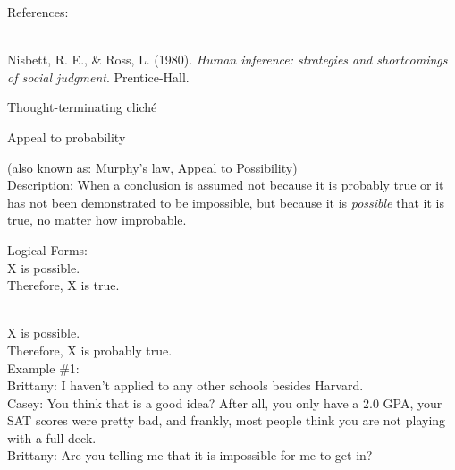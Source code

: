 \documentclass[a4paper,12pt,single,pdftex]{scrartcl}
\begin{document}
    References:

    
      
        
      \\

      
        
          Nisbett, R. E., \& Ross, L. (1980). {\it Human inference: strategies and shortcomings of social judgment}. Prentice-Hall.
        
      
    
  

Thought-terminating cliché

Appeal to probability
    
      (also known as: Murphy's law, Appeal to Possibility)
    \\

  
    Description: When a conclusion is assumed not because it is probably true or it has not been demonstrated to be impossible, but because it is {\it possible}  that it is true, no matter how improbable.

    
      Logical Forms:
    \\

    
      X is possible.
    \\

    
      Therefore, X is true.
    \\

    
       \newline

       \newline

      
    \\

    
      X is possible.
    \\

    
      Therefore, X is probably true.
    \\

    
      Example \#1:
    \\

    
      Brittany: I haven’t applied to any other schools besides Harvard.
    \\

    
      Casey: You think that is a good idea?  After all, you only have a 2.0 GPA, your SAT scores were pretty bad, and frankly, most people think you are not playing with a full deck.
    \\

    
      Brittany: Are you telling me that it is impossible for me to get in?
    \\
\end{document}
